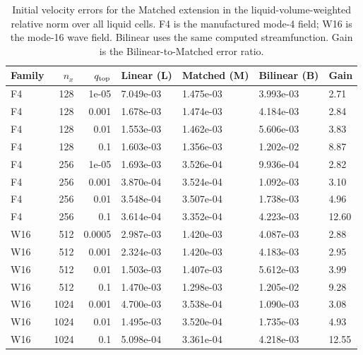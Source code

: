 \begin{table}[htbp]
\centering\small
\caption{Initial velocity errors for the Matched extension in the liquid-volume-weighted relative norm over all liquid cells. F4 is the manufactured mode-4 field; W16 is the mode-16 wave field. Bilinear uses the same computed streamfunction. Gain is the Bilinear-to-Matched error ratio.}\label{tab:matched-extension}
\begin{tabular}{@{}lrrllll@{}}\toprule
Family & $n_x$ & $q_{\rm top}$ & Linear (L) & Matched (M) & Bilinear (B) & Gain\\\midrule
F4 & 128 & 1e-05 & 7.049e-03 & 1.475e-03 & 3.993e-03 & 2.71\\
F4 & 128 & 0.001 & 1.678e-03 & 1.474e-03 & 4.184e-03 & 2.84\\
F4 & 128 & 0.01 & 1.553e-03 & 1.462e-03 & 5.606e-03 & 3.83\\
F4 & 128 & 0.1 & 1.603e-03 & 1.356e-03 & 1.202e-02 & 8.87\\
F4 & 256 & 1e-05 & 1.693e-03 & 3.526e-04 & 9.936e-04 & 2.82\\
F4 & 256 & 0.001 & 3.870e-04 & 3.524e-04 & 1.092e-03 & 3.10\\
F4 & 256 & 0.01 & 3.548e-04 & 3.507e-04 & 1.738e-03 & 4.96\\
F4 & 256 & 0.1 & 3.614e-04 & 3.352e-04 & 4.223e-03 & 12.60\\
W16 & 512 & 0.0005 & 2.987e-03 & 1.420e-03 & 4.087e-03 & 2.88\\
W16 & 512 & 0.001 & 2.324e-03 & 1.420e-03 & 4.183e-03 & 2.95\\
W16 & 512 & 0.01 & 1.503e-03 & 1.407e-03 & 5.612e-03 & 3.99\\
W16 & 512 & 0.1 & 1.470e-03 & 1.298e-03 & 1.205e-02 & 9.28\\
W16 & 1024 & 0.001 & 4.700e-03 & 3.538e-04 & 1.090e-03 & 3.08\\
W16 & 1024 & 0.01 & 1.495e-03 & 3.520e-04 & 1.735e-03 & 4.93\\
W16 & 1024 & 0.1 & 5.098e-04 & 3.361e-04 & 4.218e-03 & 12.55\\
\bottomrule\end{tabular}
\end{table}

